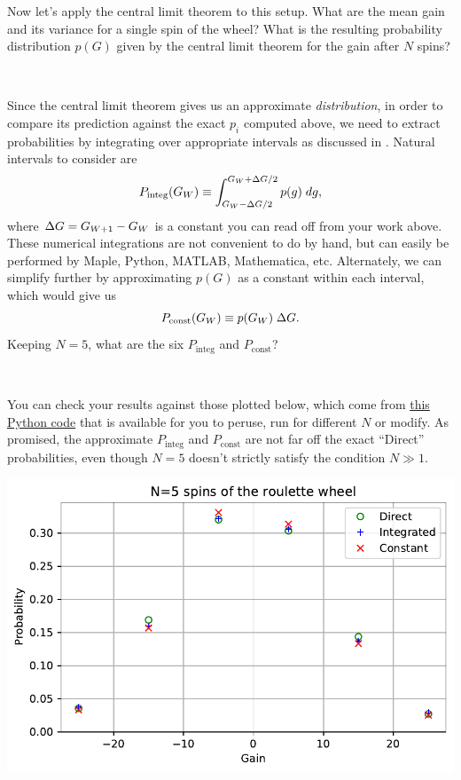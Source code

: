 Now let's apply the central limit theorem to this setup.
What are the mean gain and its variance for a single spin of the wheel?
What is the resulting probability distribution $p(G)$ given by the central limit theorem for the gain after $N$ spins?
\begin{mdframed}
  \ \\[100 pt]
\end{mdframed}
Since the central limit theorem gives us an approximate \textit{distribution}, in order to compare its prediction against the exact $p_i$ computed above, we need to extract probabilities by integrating over appropriate intervals as discussed in .
Natural intervals to consider are
\begin{equation*}
  P_{\text{integ}}(G_W) \equiv \int_{G_W - \Delta G / 2}^{G_W + \Delta G / 2} p(g) \; dg,
\end{equation*}
where $\Delta G = G_{W + 1} - G_W$ is a constant you can read off from your work above.
These numerical integrations are not convenient to do by hand, but can easily be performed by Maple, Python, MATLAB, Mathematica, etc.
Alternately, we can simplify further by approximating $p(G)$ as a constant within each interval, which would give us
\begin{equation*}
  P_{\text{const}}(G_W) \equiv p(G_W) \; \Delta G.
\end{equation*}
Keeping $N = 5$, what are the six $P_{\text{integ}}$ and $P_{\text{const}}$?
\begin{mdframed}
  \ \\[100 pt]
\end{mdframed}
You can check your results against those plotted below, which come from \href{https://github.com/daschaich/MATH327_2023/blob/main/lecture_notes/unit01_prob.py}{this Python code} that is available for you to peruse, run for different $N$ or modify.
As promised, the approximate $P_{\text{integ}}$ and $P_{\text{const}}$ are not far off the exact ``Direct'' probabilities, even though $N = 5$ doesn't strictly satisfy the condition $N \gg 1$.
\begin{center}
  \includegraphics[width=\textwidth]{figs/unit01_roulette_prob.pdf}
\end{center}



